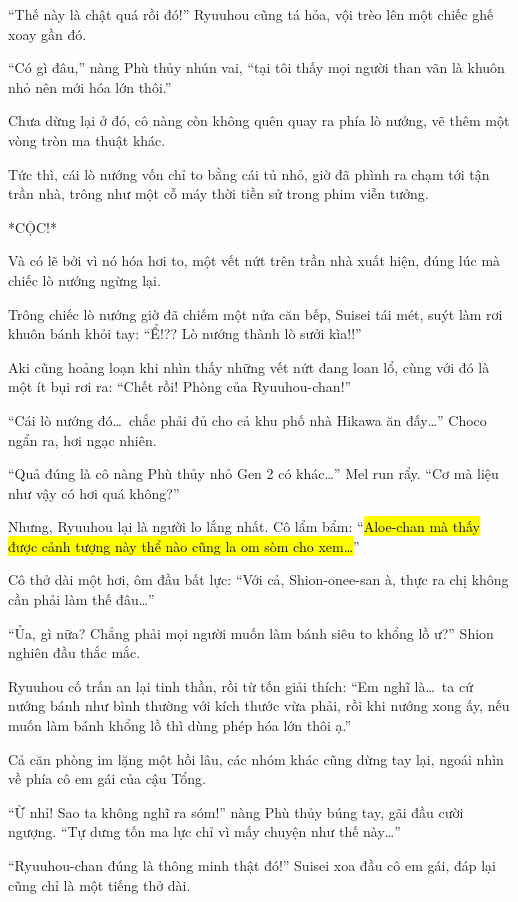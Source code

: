 \documentclass[../main.tex]{subfiles}
\begin{document}
``Thế này là chật quá rồi đó!'' Ryuuhou cũng tá hỏa, vội trèo lên một chiếc ghế xoay gần đó.

``Có gì đâu,'' nàng Phù thủy nhún vai, ``tại tôi thấy mọi người than vãn là khuôn nhỏ nên mới hóa lớn thôi.''

Chưa dừng lại ở đó, cô nàng còn không quên quay ra phía lò nướng, vẽ thêm một vòng tròn ma thuật khác.

Tức thì, cái lò nướng vốn chỉ to bằng cái tủ nhỏ, giờ đã phình ra chạm tới tận trần nhà, trông như một cỗ máy thời tiền sử trong phim viễn tưởng.

*CỘC!*

Và có lẽ bởi vì nó hóa hơi to, một vết nứt trên trần nhà xuất hiện, đúng lúc mà chiếc lò nướng ngừng lại.

Trông chiếc lò nướng giờ đã chiếm một nửa căn bếp, Suisei tái mét, suýt làm rơi khuôn bánh khỏi tay: ``Ể!?? Lò nướng thành lò sưởi kìa!!''

Aki cũng hoảng loạn khi nhìn thấy những vết nứt đang loan lổ, cùng với đó là một ít bụi rơi ra: ``Chết rồi! Phòng của Ryuuhou-chan!''

``Cái lò nướng đó\dots\ chắc phải đủ cho cả khu phố nhà Hikawa ăn đấy\dots'' Choco ngẩn ra, hơi ngạc nhiên.

``Quả đúng là cô nàng Phù thủy nhỏ Gen 2 có khác\dots'' Mel run rẩy. ``Cơ mà liệu như vậy có hơi quá không?''

Nhưng, Ryuuhou lại là người lo lắng nhất. Cô lẩm bẩm: ``\hl{Aloe-chan mà thấy được cảnh tượng này thể nào cũng la om sòm cho xem\dots}''

Cô thở dài một hơi, ôm đầu bất lực: ``Với cả, Shion-onee-san à, thực ra chị không cần phải làm thế đâu\dots''

``Ủa, gì nữa? Chẳng phải mọi người muốn làm bánh siêu to khổng lồ ư?'' Shion nghiên đầu thắc mắc.

Ryuuhou cố trấn an lại tinh thần, rồi từ tốn giải thích: ``Em nghĩ là\dots\ ta cứ nướng bánh như bình thường với kích thước vừa phải, rồi khi nướng xong ấy, nếu muốn làm bánh khổng lồ thì dùng phép hóa lớn thôi ạ.''

Cả căn phòng im lặng một hồi lâu, các nhóm khác cũng dừng tay lại, ngoái nhìn về phía cô em gái của cậu Tổng.

``Ừ nhỉ! Sao ta không nghĩ ra sóm!'' nàng Phù thủy búng tay, gãi đầu cười ngượng. ``Tự dưng tốn ma lực chỉ vì mấy chuyện như thế này\dots''

``Ryuuhou-chan đúng là thông minh thật đó!'' Suisei xoa đầu cô em gái, đáp lại cũng chỉ là một tiếng thở dài.
\end{document}
